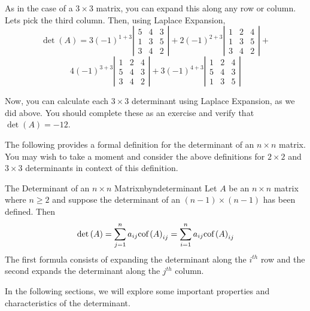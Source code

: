 \begin{solution} As in the case of a $3\times 3$ matrix, you can expand this along any row or
column. Lets pick the third column. Then, using Laplace Expansion, 
\begin{equation*}
\det \left( A\right) 
=
3\left( -1\right) ^{1+3}\left\vert
\begin{array}{rrr}
5 & 4 & 3 \\
1 & 3 & 5 \\
3 & 4 & 2
\end{array}
\right\vert +2\left( -1\right) ^{2+3}\left\vert
\begin{array}{rrr}
1 & 2 & 4 \\
1 & 3 & 5 \\
3 & 4 & 2
\end{array}
\right\vert +
\end{equation*}
\begin{equation*}
4\left( -1\right) ^{3+3}\left\vert
\begin{array}{rrr}
1 & 2 & 4 \\
5 & 4 & 3 \\
3 & 4 & 2
\end{array}
\right\vert +3\left( -1\right) ^{4+3}\left\vert
\begin{array}{rrr}
1 & 2 & 4 \\
5 & 4 & 3 \\
1 & 3 & 5
\end{array}
\right\vert 
\end{equation*}

Now, you can calculate each $3 \times 3$ determinant using Laplace Expansion, as we did above. 
You should complete these as an exercise and verify that $\det \left( A \right)= -12$. 
\end{solution}

The following provides a formal definition for the determinant of an $n \times n$ matrix. You may
wish to take a moment and consider the above definitions for $2 \times 2$ and $3 \times 3$ determinants 
in context of this definition.

\begin{definition}{The Determinant of an $n\times n$ Matrix}{nbyndeterminant}
Let $A$ be an $n\times n$ matrix where $n\geq 2$ and suppose the
determinant of an $\left( n-1\right) \times \left( n-1\right) $ has been
defined. Then
\begin{equation*}
\det \left( A\right) =\sum_{j=1}^{n}a_{ij}\mbox{cof}\left( A\right)
_{ij}=\sum_{i=1}^{n}a_{ij}\mbox{cof}\left( A\right) _{ij}
\end{equation*}
The first formula consists of expanding the determinant along the $i^{th}$
row and the second expands the determinant along the $j^{th}$ column.
\end{definition}

In the following sections, we will explore some important properties and characteristics of the determinant.